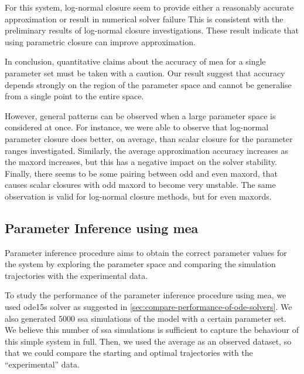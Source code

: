 For this system, log-normal closure seem to provide either a reasonably accurate approximation or result in numerical solver failure
This is consistent with the preliminary results of log-normal closure investigations\cite{lakatos_preparation_2014}.
These result indicate that using parametric closure can improve approximation.

In conclusion, quantitative claims about the accuracy of \gls{mea} for a single parameter set must be taken with a caution.
Our result suggest that accuracy depends strongly on the region of the parameter space and cannot be generalise from a single point to the entire space.

However, general patterns can be observed when a large parameter space is considered at once. 
For instance, we were able to observe that log-normal parameter closure does better, on average, than scalar closure for the parameter ranges investigated. 
Similarly, the average approximation accuracy increases as the \gls{maxord} increases, but this has a negative impact on the solver stability.
Finally, there seems to be some pairing between odd and even \gls{maxord}, 
that causes scalar closures with odd \gls{maxord} to become very unstable.
The same observation is valid for log-normal closure methods, but for even \gls{maxord}s.



\subsection{Parameter Inference using \acrlong{mea}}
\label{sec:results:inference}

Parameter inference procedure aims to obtain the correct parameter values for the system by exploring the parameter space and comparing the simulation trajectories with the experimental data.

To study the performance of the parameter inference procedure using \acrlong{mea},
we used ode15s solver as suggested in \autoref{sec:compare-performance-of-ode-solvers}. We also generated $5000$ \acrfull{ssa} simulations of the \pft{} model with a certain parameter set. 
We believe this number of \gls{ssa} simulations is sufficient to capture the behaviour of this simple system in full.
Then, we used the average as an observed dataset, so that we could compare the starting and optimal trajectories with the ``experimental'' data.

